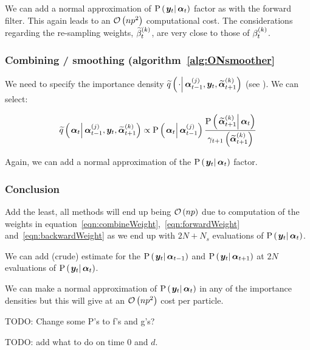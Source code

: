 We can add a normal approximation of $\propC{\vec{y}_t}{\vec{\alpha}_t}$ factor as with the forward filter. This again leads to an $\mathcal{O}\left( np^2\right)$ computational cost. The considerations regarding the re-sampling weights, $\widetilde{\beta}_{t}^{\left( k\right)}$, are very close to those of $\beta_{t}^{\left( k\right)}$.

\subsubsection*{Combining / smoothing (algorithm~\ref{alg:ONsmoother}}
We need to specify the importance density $\IDAproxC{\cdot}{\partic{\vec{\alpha}}{t-1}{j},\vec{y}_t, \particB{\vec{\alpha}}{t+1}{k}}$ (see \citet[page 453] {fearnhead10}). We can select:

\begin{equation}
	\IDAproxC{\vec{\alpha}_t}{\partic{\vec{\alpha}}{t-1}{j},\vec{y}_t, \particB{\vec{\alpha}}{t+1}{k}} \propto %
%
	\propC{\vec{\alpha}_t}{\partic{\vec{\alpha}}{t - 1}{j}}
	\frac{
		\propC{\particB{\vec{\alpha}}{t + 1}{k}}{\vec{\alpha}_t}
	}{
		\gamma_{t + 1}\Lparen{\particB{\vec{\alpha}}{t + 1}{k}}
	}
\end{equation}

Again, we can add a normal approximation of the $\propC{\vec{y}_t}{\vec{\alpha}_t}$ factor.

\subsubsection*{Conclusion}
Add the least, all methods will end up being $\mathcal{O}\left( np\right)$ due to computation of the weights in equation~\eqref{eqn:combineWeight},~\eqref{eqn:forwardWeight} and~\eqref{eqn:backwardWeight} as we end up with $2N + N_s$ evaluations of $\propC{\vec{y}_t}{\vec{\alpha}_t}$.

We can add (crude) estimate for the $\propC{\vec{y}_t}{\vec{\alpha}_{t - 1}}$ and $\propC{\vec{y}_t}{\vec{\alpha}_{t + 1}}$ at  $2N$ evaluations of  $\propC{\vec{y}_t}{\vec{\alpha}_t}$.

We can make a normal approximation of  $\propC{\vec{y}_t}{\vec{\alpha}_t}$ in any of the importance densities but this will give at an $\mathcal{O}\left( np^2\right)$ cost per particle.

TODO: Change some P's to f's and g's?

TODO: add what to do on time 0 and $d$.

